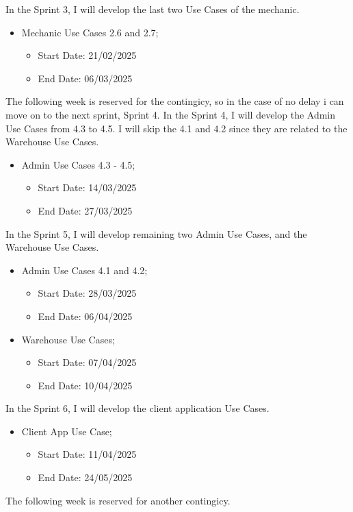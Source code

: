 In the Sprint 3, I will develop the last two Use Cases of the mechanic.  

  \begin{itemize}
    \item Mechanic Use Cases 2.6 and 2.7;
    \begin{itemize}
      \item Start Date: 21/02/2025 
      \item End Date: 06/03/2025 
  \end{itemize}
\end{itemize}

The following week is reserved for the contingicy, so in the case of no delay i can move on to the next sprint, Sprint 4.
In the Sprint 4, I will develop the Admin Use Cases from 4.3 to 4.5. I will skip the 4.1 and 4.2 since they are related to the Warehouse Use Cases.

    \begin{itemize}
      \item Admin Use Cases 4.3 - 4.5;
    \begin{itemize}
      \item Start Date: 14/03/2025 
      \item End Date: 27/03/2025 
  \end{itemize}
\end{itemize}

In the Sprint 5, I will develop remaining two Admin Use Cases, and the Warehouse Use Cases.

\begin{itemize}
  \item Admin Use Cases 4.1 and 4.2;
  \begin{itemize}
    \item Start Date: 28/03/2025 
    \item End Date: 06/04/2025 
  \end{itemize}
  \item Warehouse Use Cases;
  \begin{itemize}
    \item Start Date: 07/04/2025 
    \item End Date: 10/04/2025 
  \end{itemize}
\end{itemize}

In the Sprint 6, I will develop the client application Use Cases.

\begin{itemize}
  \item Client App Use Case;
  \begin{itemize}
    \item Start Date: 11/04/2025  
    \item End Date: 24/05/2025 
  \end{itemize} 
\end{itemize}
The following week is reserved for another contingicy.

